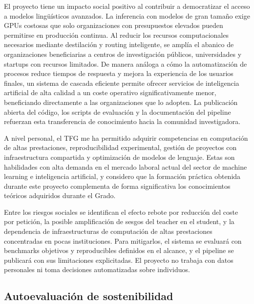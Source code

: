 \documentclass[11pt,a4paper]{article}
\begin{document}
El proyecto tiene un impacto social positivo al contribuir a democratizar el acceso a modelos lingüísticos avanzados. La inferencia con modelos de gran tamaño exige GPUs costosas que solo organizaciones con presupuestos elevados pueden permitirse en producción continua. Al reducir los recursos computacionales necesarios mediante destilación y routing inteligente, se amplía el abanico de organizaciones beneficiarias a centros de investigación públicos, universidades y startups con recursos limitados. De manera análoga a cómo la automatización de procesos reduce tiempos de respuesta y mejora la experiencia de los usuarios finales, un sistema de cascada eficiente permite ofrecer servicios de inteligencia artificial de alta calidad a un coste operativo significativamente menor, beneficiando directamente a las organizaciones que lo adopten. La publicación abierta del código, los scripts de evaluación y la documentación del pipeline refuerzan esta transferencia de conocimiento hacia la comunidad investigadora.

A nivel personal, el TFG me ha permitido adquirir competencias en computación de altas prestaciones, reproducibilidad experimental, gestión de proyectos con infraestructura compartida y optimización de modelos de lenguaje. Estas son habilidades con alta demanda en el mercado laboral actual del sector de machine learning e inteligencia artificial, y considero que la formación práctica obtenida durante este proyecto complementa de forma significativa los conocimientos teóricos adquiridos durante el Grado.

Entre los riesgos sociales se identifican el efecto rebote por reducción del coste por petición, la posible amplificación de sesgos del teacher en el student, y la dependencia de infraestructuras de computación de altas prestaciones concentradas en pocas instituciones. Para mitigarlos, el sistema se evaluará con benchmarks objetivos y reproducibles definidos en el alcance, y el pipeline se publicará con sus limitaciones explicitadas. El proyecto no trabaja con datos personales ni toma decisiones automatizadas sobre individuos.

\subsection{Autoevaluación de sostenibilidad}
\end{document}
